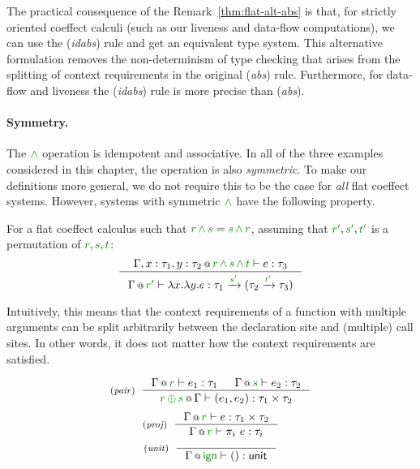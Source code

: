 \noindent
The practical consequence of the Remark~\ref{thm:flat-alt-abs} is that, for strictly
oriented coeffect calculi (such as our liveness and data-flow computations), we can use
the (\emph{idabs}) rule and get an equivalent type system. This alternative formulation
removes the non-determinism of type checking that arises from the splitting of context 
requirements in the original (\emph{abs}) rule. Furthermore, for data-flow and liveness
the (\emph{idabs}) rule is more precise than (\emph{abs}).

\paragraph{Symmetry.}
The $\czip$ operation is idempotent and associative. In all of the three examples considered in 
this chapter, the operation is also \emph{symmetric}. To make our definitions more general, we
do not require this to be the case for \emph{all} flat coeffect systems. However, systems with
symmetric $\czip$ have the following property.

\begin{remark}
For a flat coeffect calculus such that $\cclrd{r}\,\czip\,\cclrd{s} = \cclrd{s}\,\czip\,\cclrd{r}$,
assuming that $\cclrd{r'}, \cclrd{s'}, \cclrd{t'}$ is a permutation of $\cclrd{r},\cclrd{s},\cclrd{t}$:
%
\begin{equation*}
\inference
  {\coctx{\Gamma, x:\tau_1, y:\tau_2}{\cclrd{r} \,\czip\, \cclrd{s} \,\czip\, \cclrd{t}} \vdash e : \tau_3}
  {\coctx{\Gamma}{\cclrd{r'}} \vdash \lambda x.\lambda y.e : 
      \tau_1 \xrightarrow{\cclrd{s'}} (\tau_2 \xrightarrow{\cclrd{t'}} \tau_3) }
\end{equation*} 
\end{remark}

\noindent
Intuitively, this means that the context requirements of a function with multiple arguments can be 
split arbitrarily between the declaration site and (multiple) call sites. In other words, it does
not matter how the context requirements are satisfied.


\begin{figure}[t]
\begin{equation*}
\tyrule{pair}
  {\coctx{\Gamma}{\cclrd{r}} \vdash e_1 : \tau_1 & \coctx{\Gamma}{\cclrd{s}} \vdash e_2 : \tau_2}
  {\coctx{\cclrd{r}\,\cpar\,\cclrd{s}}{\Gamma} \vdash (e_1, e_2) : \tau_1 \times \tau_2 }
\end{equation*}
\begin{equation*}
\tyrule{proj}
  {\coctx{\Gamma}{\cclrd{r}} \vdash e : \tau_1 \times \tau_2 }
  {\coctx{\Gamma}{\cclrd{r}} \vdash \pi_i~e : \tau_{i} }
\end{equation*}
\begin{equation*}
\tyrule{unit}
  {}
  {\coctx{\Gamma}{\czero} \vdash () : \ident{unit} }
\end{equation*}

\label{fig:flat-ext-types}
\end{figure}

